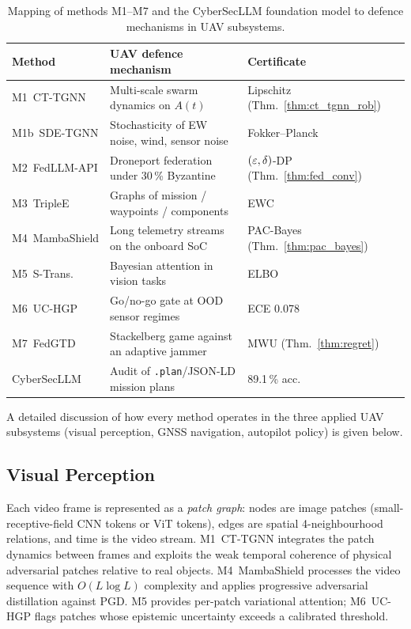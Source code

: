 \begin{table}[H]
\centering
\caption{Mapping of methods \textsf{M1}--\textsf{M7} and the
\textsf{CyberSecLLM} foundation model to defence mechanisms in UAV
subsystems.}
\label{tab:uav_mapping}
\small
\setlength{\tabcolsep}{4pt}
\renewcommand{\arraystretch}{1.2}
\begin{tabularx}{\linewidth}{@{}lXl@{}}
\toprule
\textbf{Method} & \textbf{UAV defence mechanism} & \textbf{Certificate}\\
\midrule
\textsf{M1~CT-TGNN}    & Multi-scale swarm dynamics on $A(t)$                 & Lipschitz (Thm.~\ref{thm:ct_tgnn_rob})\\
\textsf{M1b~SDE-TGNN}  & Stochasticity of EW noise, wind, sensor noise        & Fokker--Planck\\
\textsf{M2~FedLLM-API} & Droneport federation under 30\,\% Byzantine          & $(\varepsilon,\delta)$-DP (Thm.~\ref{thm:fed_conv})\\
\textsf{M3~TripleE}    & Graphs of mission / waypoints / components           & EWC\\
\textsf{M4~MambaShield}& Long telemetry streams on the onboard SoC            & PAC-Bayes (Thm.~\ref{thm:pac_bayes})\\
\textsf{M5~S-Trans.}   & Bayesian attention in vision tasks                   & ELBO\\
\textsf{M6~UC-HGP}     & Go/no-go gate at OOD sensor regimes                  & ECE 0.078\\
\textsf{M7~FedGTD}     & Stackelberg game against an adaptive jammer          & MWU (Thm.~\ref{thm:regret})\\
\textsf{CyberSecLLM}   & Audit of \texttt{.plan}/JSON-LD mission plans         & 89.1\,\% acc.\\
\bottomrule
\end{tabularx}
\end{table}

A detailed discussion of how every method operates in the three
applied UAV subsystems (visual perception, GNSS navigation, autopilot
policy) is given below.

\subsection{Visual Perception}
\label{sec:uav_vision}

Each video frame is represented as a \emph{patch graph}: nodes are
image patches (small-receptive-field CNN tokens or ViT tokens), edges
are spatial 4-neighbourhood relations, and time is the video stream.
\textsf{M1~CT-TGNN} integrates the patch dynamics between frames and
exploits the weak temporal coherence of physical adversarial patches
relative to real objects. \textsf{M4~MambaShield} processes the
video sequence with $O(L\log L)$ complexity and applies progressive
adversarial distillation against PGD. \textsf{M5} provides
per-patch variational attention; \textsf{M6~UC-HGP} flags patches
whose epistemic uncertainty exceeds a calibrated threshold.

